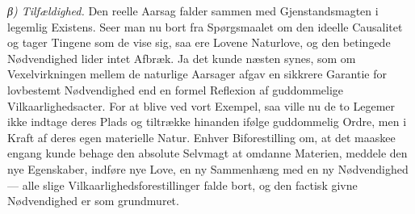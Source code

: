 \documentclass[12pt,a4paper]{book}
\newcommand{\subrunin}[1]{\emph{#1}\hspace{0.4em}}
\begin{document}
\subrunin{β) Tilfældighed.} Den reelle Aarsag falder sammen med
Gjenstandsmagten i legemlig Existens. Seer man nu bort fra
Spørgsmaalet om den ideelle Causalitet og tager Tingene som de vise
sig, saa ere Lovene Naturlove, og
den betingede Nødvendighed lider intet Afbræk. Ja det kunde næsten
synes, som om Vexelvirkningen mellem de naturlige Aarsager afgav en
sikkrere Garantie for lovbestemt Nødvendighed end en formel Reflexion
af guddommelige Vilkaarlighedsacter. For at blive ved vort Exempel, saa
ville nu de to Legemer ikke indtage deres Plads og tiltrække hinanden
ifølge guddommelig Ordre, men i Kraft af deres egen materielle Natur.
Enhver Biforestilling om, at det maaskee engang kunde behage den
absolute Selvmagt at omdanne Materien, meddele den nye Egenskaber,
indføre nye Love, en ny Sammenhæng med en ny Nødvendighed --- alle
slige Vilkaarlighedsforestillinger falde bort, og den factisk givne
Nødvendighed er som grundmuret.
\end{document}

